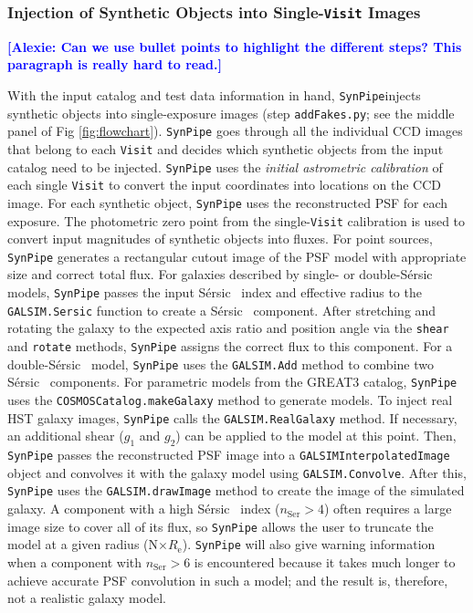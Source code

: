 \documentclass[useamsfonts]{pasj01}
\def\ser{{S\'{e}rsic\ }}
\newcommand{\alexie}[1]{\textcolor{blue}{\textbf{[Alexie: #1]}}}
\def\synpipe{\texttt{SynPipe}}
\def\visit{\texttt{Visit}}
\def\galsim{\texttt{G}{\scriptsize \texttt{AL}}\texttt{S}{\scriptsize \texttt{IM}}}
\begin{document}
\subsubsection{Injection of Synthetic Objects into Single-\visit{} Images}
    \label{sssec:addFakes}
    
    \alexie{Can we use bullet points to highlight the different steps? This paragraph is really hard to read.}

    With the input catalog and test data information in hand, \synpipe{}injects synthetic
    objects into single-exposure images (step \texttt{addFakes.py}; see the middle panel
    of Fig \ref{fig:flowchart}).
    \synpipe{} goes through all the individual CCD images that belong to each \visit{}
    and decides which synthetic objects from the input catalog need to be injected.
    \synpipe{} uses the \textit{initial astrometric calibration} of each single
    \visit{} to convert the input coordinates into locations on the CCD image. For each synthetic object, \synpipe{} uses the  reconstructed PSF for each exposure.  The photometric zero point from the single-\visit{} calibration is used to convert input magnitudes of synthetic objects into fluxes. For point sources, \synpipe{} generates a rectangular cutout image of the PSF model
    with appropriate size and correct total flux. For galaxies described by single- or double-\ser{} models, \synpipe{} passes the
    input \ser{} index and effective radius to the \galsim{}\texttt{.Sersic} function to
    create a \ser{} component.
    After stretching and rotating the galaxy to the expected axis ratio and position
    angle via the \texttt{shear} and \texttt{rotate} methods, \synpipe{} assigns the
    correct flux to this component.
    For a double-\ser{} model, \synpipe{} uses the \galsim{}\texttt{.Add} method to
    combine two \ser{} components. For  parametric models from the GREAT3 catalog, \synpipe{} uses the
    \texttt{COSMOSCatalog.makeGalaxy} method to generate models.  To inject  real HST galaxy images,  \synpipe{} calls the \galsim{}\texttt{.RealGalaxy} method.
    If necessary, an additional shear ($g_1$ and $g_2$) can be applied to the model at
    this point.
    Then, \synpipe{} passes the reconstructed PSF image into a
    \galsim{}\texttt{InterpolatedImage} object and convolves it with the galaxy model
    using \galsim{}\texttt{.Convolve}.
    After this, \synpipe{} uses the \galsim{}\texttt{.drawImage} method to create the
    image of the simulated galaxy.
    A component with a high \ser{} index ($n_{\mathrm{Ser}} > 4$) often requires a
    large image size to cover all of its flux, so \synpipe{} allows the user to
    truncate the model at a given radius (N$\times R_{\mathrm{e}}$).
    \synpipe{} will also give warning information when a component with $
    n_{\mathrm{Ser}} > 6$ is encountered because it takes much longer to achieve
    accurate PSF convolution in such a model; and the result is, therefore,
    not a realistic galaxy model.
\end{document}
